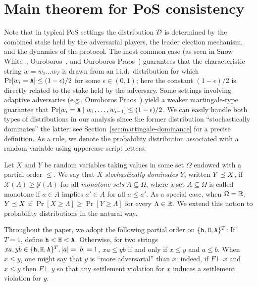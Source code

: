   \section{Main theorem for PoS consistency}
  Note that in typical PoS settings the distribution $\mathcal{D}$
  is determined by the combined stake held by the adversarial players,
  the leader election mechanism, and the dynamics of the protocol. The
  most common case (as seen in Snow White~\cite{SnowWhite},
  Ouroboros~\cite{Ouroboros}, and Ouroboros Praos~\cite{Praos})
  guarantees that the characteristic string $w = w_1 \ldots w_T$ is
  drawn from an i.i.d.\ distribution for which
  $\Pr[w_i = \mathtt{A}] \leq (1 - \epsilon)/2$ for some $\epsilon \in (0, 1)$;
  here the constant $(1-\epsilon)/2$ is directly related to the stake
  held by the adversary. Some settings involving adaptive adversaries
  (e.g., Ouroboros Praos~\cite{Praos}) yield a weaker martingale-type
  guarantee that
  $\Pr[w_i = \mathtt{A} \mid w_1, \ldots, w_{i-1}] \leq (1 - \epsilon)/2$.  We
  can easily handle both types of distributions in our analysis since
  the former distribution ``stochastically dominates'' the latter; 
  see Section~\ref{sec:martingale-dominance} for a precise definition.
  As a rule, we denote the
  probability distribution associated with a random variable using
  uppercase script letters. 
  \begin{definition}\label{def:dominance-mh} 
    Let $X$ and $Y$ be random variables taking values in some set $\Omega$ 
    endowed with a partial order $\leq$. 
    We say that $X$ \emph{stochastically dominates} $Y$, 
    written $Y \preceq X$, if 
    $
      \mathcal{X}(A) \geq \mathcal{Y}(A)
    $ 
    for all \emph{monotone sets} $A \subseteq \Omega$, 
    where a set $A \subseteq \Omega$ is called 
    monotone if $a \in A$ implies $a' \in A$ for all $a \leq a'$.
    As a special case, when $\Omega = \mathbb{R}$,  $Y \preceq X$ if
    $\Pr[X \geq \Lambda] \geq \Pr[Y \geq \Lambda]$
    for every $\Lambda \in \mathbb{R}$.  
    We extend this notion to probability
    distributions in the natural way.
  \end{definition}

  Throughout the paper, we adopt the following partial order on
  $\{\mathtt{h}, \mathtt{H}, \mathtt{A}\}^T$: If $T = 1$, define $\mathtt{h} < \mathtt{H} < \mathtt{A}$.  Otherwise,
  for two strings $xa, yb \in \{\mathtt{h}, \mathtt{H}, \mathtt{A}\}^T, |a| = |b| = 1$,
  $xa \leq yb$ if and only if $x \leq y$ and $a \leq b$. When
  $x \leq y$, one might say that $y$ is ``more adversarial'' than $x$:
  indeed, if $F \vdash x$ and $x \leq y$ then $F \vdash y$ so that any
  settlement violation for $x$ induces a settlement violation for $y$.

